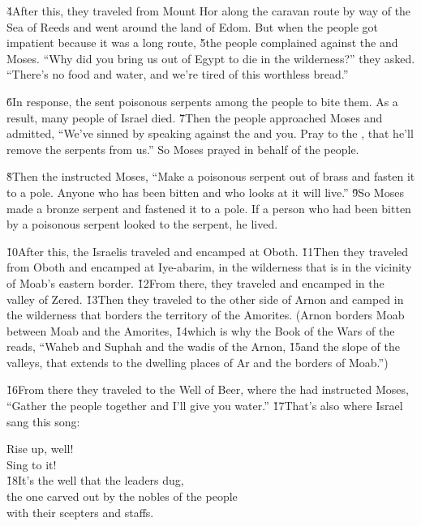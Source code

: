 \v{4}After this, they traveled from Mount Hor along the caravan route by way of the Sea of Reeds and went around the land of Edom. But when the people got impatient because it was a long route, \v{5}the people complained against the  and Moses. ``Why did you bring us out of Egypt to die in the wilderness?'' they asked. ``There's no food and water, and we're tired of this worthless bread.''

\v{6}In response, the  sent poisonous serpents among the people to bite them. As a result, many people of Israel died. \v{7}Then the people approached Moses and admitted, ``We've sinned by speaking against the  and you. Pray to the , that he'll remove the serpents from us.'' So Moses prayed in behalf of the people.

\v{8}Then the  instructed Moses, ``Make a poisonous serpent out of brass and fasten it to a pole. Anyone who has been bitten and who looks at it will live.'' \v{9}So Moses made a bronze serpent and fastened it to a pole. If a person who had been bitten by a poisonous serpent looked to the serpent, he lived.

\v{10}After this, the Israelis traveled and encamped at Oboth. \v{11}Then they traveled from Oboth and encamped at Iye-abarim, in the wilderness that is in the vicinity of Moab's eastern border. \v{12}From there, they traveled and encamped in the valley of Zered. \v{13}Then they traveled to the other side of Arnon and camped in the wilderness that borders the territory of the Amorites. (Arnon borders Moab between Moab and the Amorites, \v{14}which is why the Book of the Wars of the  reads, ``Waheb and Suphah and the wadis of the Arnon, \v{15}and the slope of the valleys, that extends to the dwelling places of Ar and the borders of Moab.'')

\v{16}From there they traveled to the Well of Beer, where the  had instructed Moses, ``Gather the people together and I'll give you water.'' \v{17}That's also where Israel sang this song:

\begin{poetry}
\poeml Rise up, well! \\
\poemll    Sing to it! \\
\poeml \v{18}It's the well that the leaders dug, \\
\poemll    the one carved out by the nobles of the people \\
\poemlll       with their scepters and staffs.
\end{poetry}

